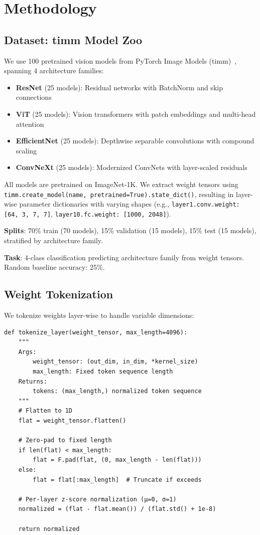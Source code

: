 \section{Methodology}

\subsection{Dataset: timm Model Zoo}

We use 100 pretrained vision models from PyTorch Image Models (timm)~\cite{wightman2019pytorch}, spanning 4 architecture families:

\begin{itemize}
\item \textbf{ResNet} (25 models): Residual networks with BatchNorm and skip connections
\item \textbf{ViT} (25 models): Vision transformers with patch embeddings and multi-head attention
\item \textbf{EfficientNet} (25 models): Depthwise separable convolutions with compound scaling
\item \textbf{ConvNeXt} (25 models): Modernized ConvNets with layer-scaled residuals
\end{itemize}

All models are pretrained on ImageNet-1K. We extract weight tensors using \texttt{timm.create\_model(name, pretrained=True).state\_dict()}, resulting in layer-wise parameter dictionaries with varying shapes (e.g., \texttt{layer1.conv.weight: [64, 3, 7, 7]}, \texttt{layer10.fc.weight: [1000, 2048]}).

\textbf{Splits}: 70\% train (70 models), 15\% validation (15 models), 15\% test (15 models), stratified by architecture family.

\textbf{Task}: 4-class classification predicting architecture family from weight tensors. Random baseline accuracy: 25\%.

\subsection{Weight Tokenization}

We tokenize weights layer-wise to handle variable dimensions:

\begin{verbatim}
def tokenize_layer(weight_tensor, max_length=4096):
    """
    Args:
        weight_tensor: (out_dim, in_dim, *kernel_size)
        max_length: Fixed token sequence length
    Returns:
        tokens: (max_length,) normalized token sequence
    """
    # Flatten to 1D
    flat = weight_tensor.flatten()

    # Zero-pad to fixed length
    if len(flat) < max_length:
        flat = F.pad(flat, (0, max_length - len(flat)))
    else:
        flat = flat[:max_length]  # Truncate if exceeds

    # Per-layer z-score normalization (μ=0, σ=1)
    normalized = (flat - flat.mean()) / (flat.std() + 1e-8)

    return normalized
\end{verbatim}

